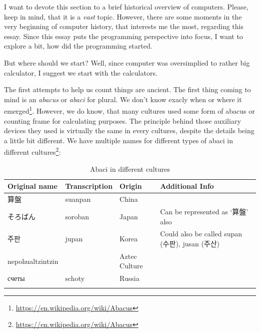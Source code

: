 \documentclass{article}
\begin{document}
            I want to devote this section to a brief historical overview of computers. Please, keep in mind, that it is a \emph{vast} topic. However, there are some moments in the very
            beginning of computer history, that interests me the most, regarding this essay. Since this essay puts the programming perspective into focus, I want to explore 
            a bit, how did the programming started. \par

            But where should we start? Well, since computer was oversimplied to rather big calculator, I suggest we start with the calculators.\par

            The first attempts to help us count things are ancient. The first thing coming to mind is an \emph{abacus} or \emph{abaci} for plural. We don't know exacly when or
            where it emerged\footnote{\href{https://en.wikipedia.org/wiki/Abacus}{https://en.wikipedia.org/wiki/Abacus}}. However, we do know, that many cultures used some form
            of abacus or counting frame for calculating purposes. The principle behind those auxiliary devices they used is virtually the same in every cultures, despite the 
            details being a little bit different. We have multiple names for different types of abaci in different
            cultures\footnote{\href{https://en.wikipedia.org/wiki/Abacus}{https://en.wikipedia.org/wiki/Abacus}}:
            \begin{table}[h]
                \centering
                \begin{longtable} {p{}p{}p{}p{}}
                    \toprule
                    Original name & Transcription & Origin & Additional Info \\
                    \toprule
                    算盤 & suanpan & China & \\
                    そろばん & soroban & Japan & Can be represented as `算盤' also \\
                    주판 & jupan & Korea & Could also be called supan (수판), jusan (주산) \\
                    nepohualtzintzin & & Aztec Culture & \\
                    счеты & schoty & Russia & \\
                    \bottomrule
                    \caption{Abaci in different cultures}
                    \end{longtable}
            \end{table}
\end{document}
